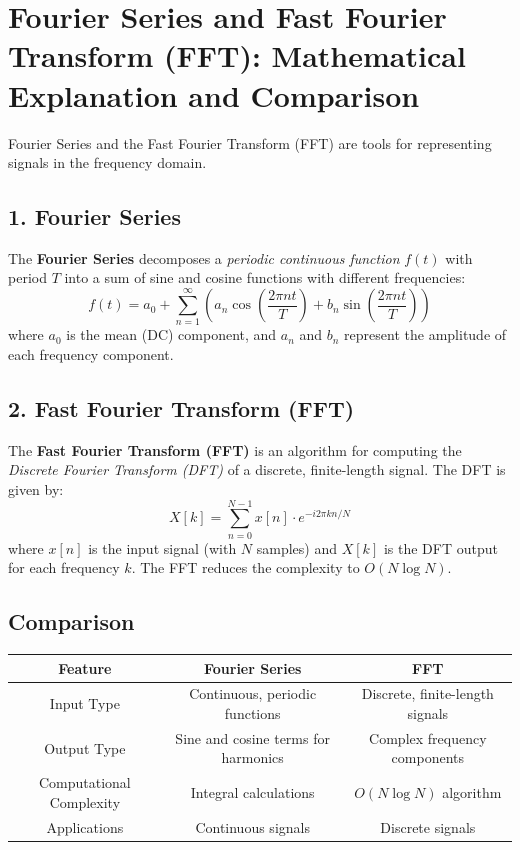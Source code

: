 \documentclass{article}
\begin{document}
\newpage
\section{Fourier Series and Fast Fourier Transform (FFT): Mathematical Explanation and Comparison}

Fourier Series and the Fast Fourier Transform (FFT) are tools for representing signals in the frequency domain.\\

\subsection{1. Fourier Series}

The \textbf{Fourier Series} decomposes a \textit{periodic continuous function} \( f(t) \) with period \( T \) into a sum of sine and cosine functions with different frequencies:\\
\[
f(t) = a_0 + \sum_{n=1}^{\infty} \left( a_n \cos\left(\frac{2 \pi n t}{T}\right) + b_n \sin\left(\frac{2 \pi n t}{T}\right) \right)
\]
where \( a_0 \) is the mean (DC) component, and \( a_n \) and \( b_n \) represent the amplitude of each frequency component.

\subsection{2. Fast Fourier Transform (FFT)}

The \textbf{Fast Fourier Transform (FFT)} is an algorithm for computing the \textit{Discrete Fourier Transform (DFT)} of a discrete, finite-length signal. The DFT is given by:\\
\[
X[k] = \sum_{n=0}^{N-1} x[n] \cdot e^{-i 2 \pi k n / N}
\]
where \( x[n] \) is the input signal (with \( N \) samples) and \( X[k] \) is the DFT output for each frequency \( k \). The FFT reduces the complexity to \( O(N \log N) \).

\subsection{Comparison}

\begin{center}
\begin{tabular}{|c|c|c|}
\hline
Feature & Fourier Series & FFT \\
\hline
Input Type & Continuous, periodic functions & Discrete, finite-length signals \\
\hline
Output Type & Sine and cosine terms for harmonics & Complex frequency components \\
\hline
Computational Complexity & Integral calculations & \( O(N \log N) \) algorithm \\
\hline
Applications & Continuous signals & Discrete signals \\
\hline
\end{tabular}
\end{center}
\end{document}
